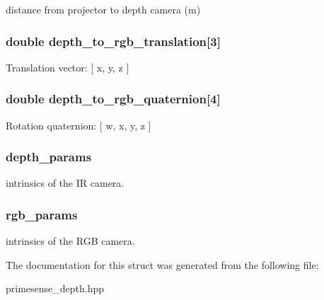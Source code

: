\label{structfovis_1_1PrimeSenseCalibrationParameters_a7b21a23b56773fa0934aed19659d091a}
distance from projector to depth camera (m) \hypertarget{structfovis_1_1PrimeSenseCalibrationParameters_a239f2048204d50d626815962621abe00}{
\subsubsection[{depth\_\-to\_\-rgb\_\-translation}]{\setlength{\rightskip}{0pt plus 5cm}double {\bf depth\_\-to\_\-rgb\_\-translation}\mbox{[}3\mbox{]}}}
\label{structfovis_1_1PrimeSenseCalibrationParameters_a239f2048204d50d626815962621abe00}
Translation vector: \mbox{[} x, y, z \mbox{]} \hypertarget{structfovis_1_1PrimeSenseCalibrationParameters_ae08cad90e6099b8284b8effd7a49e0d0}{
\subsubsection[{depth\_\-to\_\-rgb\_\-quaternion}]{\setlength{\rightskip}{0pt plus 5cm}double {\bf depth\_\-to\_\-rgb\_\-quaternion}\mbox{[}4\mbox{]}}}
\label{structfovis_1_1PrimeSenseCalibrationParameters_ae08cad90e6099b8284b8effd7a49e0d0}
Rotation quaternion: \mbox{[} w, x, y, z \mbox{]} \hypertarget{structfovis_1_1PrimeSenseCalibrationParameters_a02b8ac0eb76a582c54d1dd513d4ffb67}{
\subsubsection[{depth\_\-params}]{ {\bf depth\_\-params}}}
\label{structfovis_1_1PrimeSenseCalibrationParameters_a02b8ac0eb76a582c54d1dd513d4ffb67}
intrinsics of the IR camera. \hypertarget{structfovis_1_1PrimeSenseCalibrationParameters_a7c3992201264ae4b695547368383fc1d}{
\subsubsection[{rgb\_\-params}]{ {\bf rgb\_\-params}}}
\label{structfovis_1_1PrimeSenseCalibrationParameters_a7c3992201264ae4b695547368383fc1d}
intrinsics of the RGB camera. 

The documentation for this struct was generated from the following file:\begin{DoxyCompactItemize}
\item 
primesense\_\-depth.hpp\end{DoxyCompactItemize}
